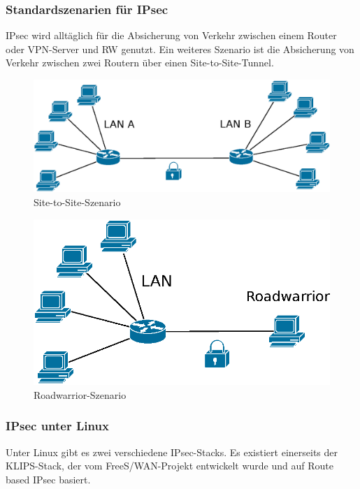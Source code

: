 \subsubsection{Standardszenarien für IPsec}
\ac{IPsec} wird alltäglich für die Absicherung von Verkehr zwischen einem Router oder \ac{VPN}-Server
und \ac{RW} genutzt. Ein weiteres Szenario ist die Absicherung von Verkehr zwischen zwei Routern
über einen Site-to-Site-Tunnel.

\begin{figure}[h!]
    \centering
    \def\svgwidth{\columnwidth}
    \includegraphics{Diagram_LAN-LAN.eps}
    \caption{Site-to-Site-Szenario}
    \label{fig:site-to-site-szenario}
\end{figure}

\begin{figure}[h!]
    \centering
    \def\svgwidth{\columnwidth}
    \includegraphics{Diagram_LAN-ROADWARRIOR.eps}
    \caption{Roadwarrior-Szenario}
    \label{fig:roadwarrior-szenario}
\end{figure}


\subsubsection{IPsec unter Linux}
Unter Linux gibt es zwei verschiedene \ac{IPsec}-Stacks.
Es existiert einerseits der KLIPS-Stack, der vom FreeS/WAN-Projekt entwickelt wurde
und auf Route based IPsec basiert.

